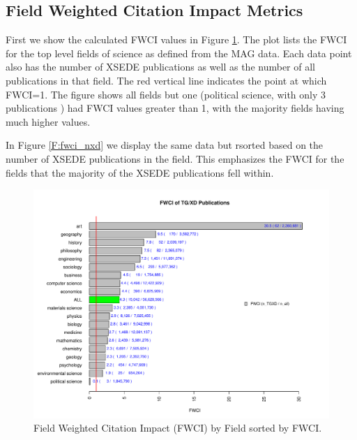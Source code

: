 \documentclass{sig-alternate}
\begin{document}
\subsection{Field Weighted Citation Impact Metrics}

First we show the calculated FWCI values in Figure
\ref{F:fwci_fwci}. The plot lists the FWCI for the top level fields of
science as defined from the MAG data.  Each data point also has the
number of XSEDE publications as well as the number of all publications
in that field. The red vertical line indicates the point at which
FWCI=1. The figure shows all fields but one (political science, with
only 3 publications ) had FWCI values greater than 1, with the
majority fields having much higher values.

In Figure \ref{F:fwci_nxd} we display the same data but rsorted based
on the number of XSEDE publications in the field. This emphasizes the
FWCI for the fields that the majority of the XSEDE publications fell
within.

\begin{figure}[htb!]
    \includegraphics[width=0.95\columnwidth]{images/fwci_fwci.pdf}
    \caption{Field Weighted Citation Impact (FWCI) by Field sorted by FWCI.}
    \label{F:fwci_fwci}
\end{figure}
\end{document}
